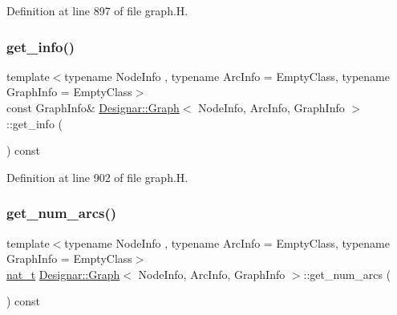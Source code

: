Definition at line 897 of file graph.\+H.

\mbox{\label{class_designar_1_1_graph_adfbae301b6a211adaf1919bc41db176a}} 
\subsubsection{\texorpdfstring{get\+\_\+info()}{get\_info()}\hspace{0.1cm}{\footnotesize\ttfamily [2/2]}}
{\footnotesize\ttfamily template$<$typename Node\+Info , typename Arc\+Info  = Empty\+Class, typename Graph\+Info  = Empty\+Class$>$ \\
const Graph\+Info\& \hyperlink{class_designar_1_1_graph}{Designar\+::\+Graph}$<$ Node\+Info, Arc\+Info, Graph\+Info $>$\+::get\+\_\+info (\begin{DoxyParamCaption}{ }\end{DoxyParamCaption}) const\hspace{0.3cm}{\ttfamily [inline]}}



Definition at line 902 of file graph.\+H.

\mbox{\label{class_designar_1_1_graph_a5b155eda66a4c90f6a34b25c80d9342b}} 
\subsubsection{\texorpdfstring{get\+\_\+num\+\_\+arcs()}{get\_num\_arcs()}}
{\footnotesize\ttfamily template$<$typename Node\+Info , typename Arc\+Info  = Empty\+Class, typename Graph\+Info  = Empty\+Class$>$ \\
\hyperlink{namespace_designar_aa72662848b9f4815e7bf31a7cf3e33d1}{nat\+\_\+t} \hyperlink{class_designar_1_1_graph}{Designar\+::\+Graph}$<$ Node\+Info, Arc\+Info, Graph\+Info $>$\+::get\+\_\+num\+\_\+arcs (\begin{DoxyParamCaption}{ }\end{DoxyParamCaption}) const\hspace{0.3cm}{\ttfamily [inline]}}



